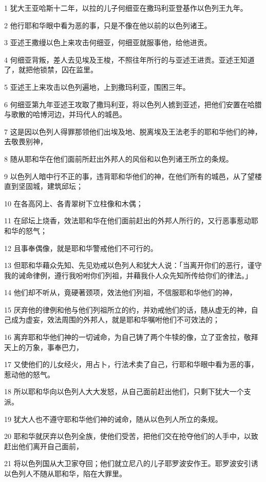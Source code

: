 \par 1 犹大王亚哈斯十二年，以拉的儿子何细亚在撒玛利亚登基作以色列王九年。
\par 2 他行耶和华眼中看为恶的事，只是不像在他以前的以色列诸王。
\par 3 亚述王撒缦以色上来攻击何细亚，何细亚就服事他，给他进贡。
\par 4 何细亚背叛，差人去见埃及王梭，不照往年所行的与亚述王进贡。亚述王知道了，就把他锁禁，囚在监里。
\par 5 亚述王上来攻击以色列遍地，上到撒玛利亚，围困三年。
\par 6 何细亚第九年亚述王攻取了撒玛利亚，将以色列人掳到亚述，把他们安置在哈腊与歌散的哈博河边，并玛代人的城邑。
\par 7 这是因以色列人得罪那领他们出埃及地、脱离埃及王法老手的耶和华他们的神，去敬畏别神，
\par 8 随从耶和华在他们面前所赶出外邦人的风俗和以色列诸王所立的条规。
\par 9 以色列人暗中行不正的事，违背耶和华他们的神，在他们所有的城邑，从了望楼直到坚固城，建筑邱坛；
\par 10 在各高冈上、各青翠树下立柱像和木偶；
\par 11 在邱坛上烧香，效法耶和华在他们面前赶出的外邦人所行的，又行恶事惹动耶和华的怒气；
\par 12 且事奉偶像，就是耶和华警戒他们不可行的。
\par 13 但耶和华藉众先知、先见劝戒以色列人和犹大人说：「当离开你们的恶行，谨守我的诫命律例，遵行我吩咐你们列祖，并藉我仆人众先知所传给你们的律法。」
\par 14 他们却不听从，竟硬著颈项，效法他们列祖，不信服耶和华他们的神，
\par 15 厌弃他的律例和他与他们列祖所立的约，并劝戒他们的话，随从虚无的神，自己成为虚妄，效法周围的外邦人，就是耶和华嘱咐他们不可效法的；
\par 16 离弃耶和华他们神的一切诫命，为自己铸了两个牛犊的像，立了亚舍拉，敬拜天上的万象，事奉巴力，
\par 17 又使他们的儿女经火，用占卜，行法术卖了自己，行耶和华眼中看为恶的事，惹动他的怒气。
\par 18 所以耶和华向以色列人大大发怒，从自己面前赶出他们，只剩下犹大一个支派。
\par 19 犹大人也不遵守耶和华他们神的诫命，随从以色列人所立的条规。
\par 20 耶和华就厌弃以色列全族，使他们受苦，把他们交在抢夺他们的人手中，以致赶出他们离开自己面前，
\par 21 将以色列国从大卫家夺回；他们就立尼八的儿子耶罗波安作王。耶罗波安引诱以色列人不随从耶和华，陷在大罪里。
